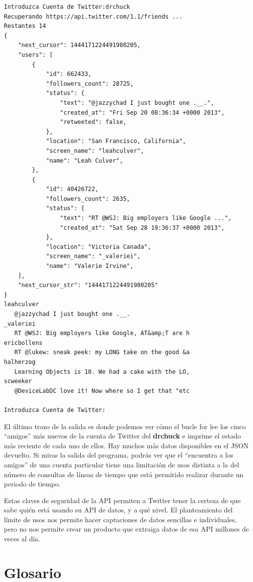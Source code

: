 \beforeverb
\begin{verbatim}
Introduzca Cuenta de Twitter:drchuck
Recuperando https://api.twitter.com/1.1/friends ...
Restantes 14
{
    "next_cursor": 1444171224491980205, 
    "users": [
        {
            "id": 662433, 
            "followers_count": 28725, 
            "status": {
                "text": "@jazzychad I just bought one .__.", 
                "created_at": "Fri Sep 20 08:36:34 +0000 2013", 
                "retweeted": false, 
            }, 
            "location": "San Francisco, California", 
            "screen_name": "leahculver", 
            "name": "Leah Culver", 
        }, 
        {
            "id": 40426722, 
            "followers_count": 2635, 
            "status": {
                "text": "RT @WSJ: Big employers like Google ...", 
                "created_at": "Sat Sep 28 19:36:37 +0000 2013", 
            }, 
            "location": "Victoria Canada", 
            "screen_name": "_valeriei", 
            "name": "Valerie Irvine", 
    ], 
    "next_cursor_str": "1444171224491980205"
}
leahculver
   @jazzychad I just bought one .__.
_valeriei
   RT @WSJ: Big employers like Google, AT&amp;T are h
ericbollens
   RT @lukew: sneak peek: my LONG take on the good &a
halherzog
   Learning Objects is 10. We had a cake with the LO,
scweeker
   @DeviceLabDC love it! Now where so I get that "etc

Introduzca Cuenta de Twitter:
\end{verbatim}
\afterverb
%
El último trozo de la salida es donde podemos ver cómo el bucle for lee los
cinco ``amigos'' más nuevos de la cuenta de Twitter del {\bf drchuck}
e imprime el estado más reciente de cada uno de ellos. Hay
muchos más datos disponibles en el JSON devuelto. Si miras
la salida del programa, podrás ver que el ``encuentra a los amigos''
de una cuenta particular tiene una limitación de usos distinta a la del
número de consultas de líneas de tiempo que está permitido realizar
durante un periodo de tiempo.

Estas claves de seguridad de la API permiten a Twitter tener la certeza de que
sabe quién está usando su API de datos, y a qué nivel. El planteamiento del
límite de usos nos permite hacer captaciones de datos sencillas e individuales, pero
no nos permite crear un producto que extraiga datos de esa API
millones de veces al día.

\section{Glosario}

